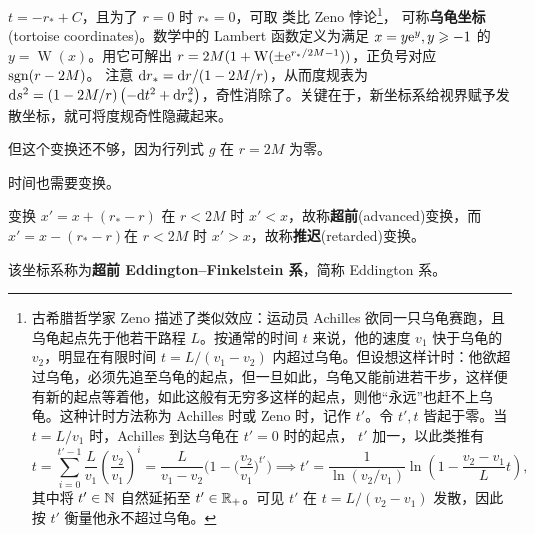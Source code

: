 $t=-r_*+C$，且为了 $r=0$ 时 $r_*=0$，可取
类比 Zeno 悖论\footnote{古希腊哲学家 Zeno 描述了类似效应：运动员 Achilles 欲同一只乌龟赛跑，且乌龟起点先于他若干路程 $L$。按通常的时间 $t$ 来说，他的速度 $v_1$ 快于乌龟的 $v_2$，明显在有限时间 $t=L/(v_1-v_2)$ 内超过乌龟。但设想这样计时：他欲超过乌龟，必须先追至乌龟的起点，但一旦如此，乌龟又能前进若干步，这样便有新的起点等着他，如此这般有无穷多这样的起点，则他“永远”也赶不上乌龟。这种计时方法称为 Achilles 时或 Zeno 时，记作 $t'$。令 $t',t$ 皆起于零。当 $t=L/v_1$ 时，Achilles 到达乌龟在 $t'=0$ 时的起点， $t'$ 加一，以此类推有
\[t=\sum_{i=0}^{t'-1} \frac{L}{v_1}\left(\frac{v_2}{v_1}\right)^{i}=\frac{L}{v_1-v_2}\bigg(1-\bigg(\frac{v_2}{v_1}\bigg)^{t'}\bigg)\implies t'=\frac{1}{\ln(v_2/v_1)}\ln\left(1-\frac{v_2-v_1}{L}t\right),\]
其中将 $t'\in\mathbb{N}$ 自然延拓至 $t'\in\mathbb{R}_+$。可见 $t'$ 在 $t=L/(v_2-v_1)$ 发散，因此按 $t'$ 衡量他永不超过乌龟。}，
可称\textbf{乌龟坐标}(tortoise coordinates)。数学中的 Lambert 函数定义为满足 $x=y\mathrm{e}^y,y\geqslant -1$ 的$y=\operatorname{W}(x)$。用它可解出 $r=2M(1+\operatorname{W}(\pm\mathrm{e}^{r_*/2M-1}))$，正负号对应 $\operatorname{sgn}(r-2M)$。
注意 $\dd r_*={\dd r}/{(1-2M/r)}$，从而度规表为 $\dd s^2=(1-2M/r)\left(-\dd t^2+\dd r_*^2\right)$，奇性消除了。关键在于，新坐标系给视界赋予发散坐标，就可将度规奇性隐藏起来。

但这个变换还不够，因为行列式 $g$ 在 $r=2M$ 为零。

时间也需要变换。

变换 $x'=x+(r_*-r)$ 在 $r<2M$ 时 $x'<x$，故称\textbf{超前}(advanced)变换，而 $x'=x-(r_*-r)$在 $r<2M$ 时 $x'>x$，故称\textbf{推迟}(retarded)变换。

该坐标系称为\textbf{超前 Eddington–Finkelstein 系}，简称 Eddington 系。



